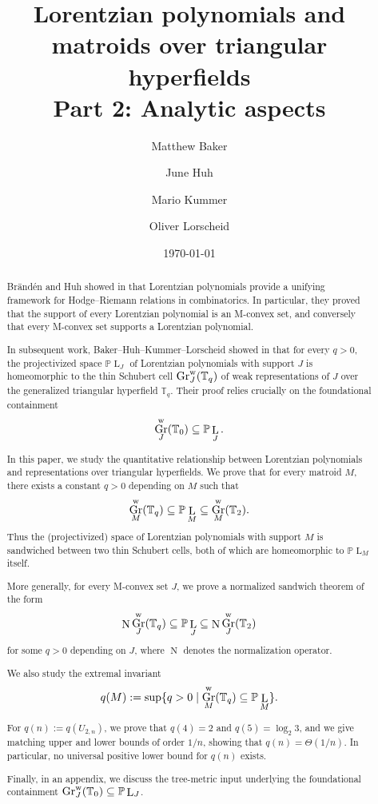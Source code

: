 \documentclass[12pt]{amsart}
\title{Lorentzian polynomials and matroids over triangular hyperfields\\[10pt] \normalsize Part 2: Analytic aspects}
\author{Matthew Baker}
\author{June Huh}
\author{Mario Kummer}
\author{Oliver Lorscheid}
\date{\today}
\theoremstyle{definition}
\newcommand{\1}{\mathbf{1}}
\DeclareMathOperator{\upN}{N}   %
\DeclareMathOperator{\upL}{L}   %
\DeclareMathOperator{\Gr}{Gr}
\renewcommand\P{{\mathbb P}}
\newcommand\T{{\mathbb T}}
\begin{document}
\begin{abstract}
Br\"and\'en and Huh showed in \cite{Branden-Huh20} that Lorentzian polynomials provide a unifying framework
for Hodge--Riemann relations in combinatorics. In particular, they proved that the support of every Lorentzian polynomial is an M-convex set, and conversely that every M-convex set supports a Lorentzian polynomial. 

In subsequent work, Baker--Huh--Kummer--Lorscheid showed in \cite{BHKL1} that for every $q>0$, the projectivized space $\P\upL_J$ of Lorentzian polynomials with support $J$ is homeomorphic to the thin Schubert cell $\Gr^{\rm w}_J(\T_q)$ of weak representations of $J$ over the generalized triangular hyperfield $\T_q$. Their proof relies crucially on the foundational containment
\[
\Gr^{\rm w}_J(\T_0)\subseteq \P\upL_J.
\]

In this paper, we study the quantitative relationship between Lorentzian polynomials and representations over triangular hyperfields. We prove that for every matroid $M$, there exists a constant $q>0$ depending on $M$ such that
\[
\Gr^{\rm w}_M(\T_q) \subseteq \P\upL_M \subseteq \Gr^{\rm w}_M(\T_2).
\]
Thus the (projectivized) space of Lorentzian polynomials with support $M$ is sandwiched between two thin Schubert cells, both of which are homeomorphic to $\P\upL_M$ itself.

More generally, for every M-convex set $J$, we prove a normalized sandwich theorem of the form
\[
\upN\Gr^{\rm w}_J(\T_q)\subseteq \P\upL_J \subseteq \upN\Gr^{\rm w}_J(\T_2)
\]
for some $q>0$ depending on $J$, where $\upN$ denotes the normalization operator.


We also study the extremal invariant
\[
q(M):=\sup\{q>0 \mid \Gr^{\rm w}_M(\T_q)\subseteq \P\upL_M\}.
\]

For $q(n):=q(U_{2,n})$, we prove that $q(4)=2$ and $q(5)=\log_2 3$, and we give matching upper and lower
bounds of order $1/n$, showing that $q(n)=\Theta(1/n)$. In particular, no universal positive
lower bound for $q(n)$ exists.

Finally, in an appendix, we discuss the tree-metric input underlying the foundational containment $\Gr^{\rm w}_J(\T_0)\subseteq \P\upL_J$.
\end{abstract}
\end{document}
